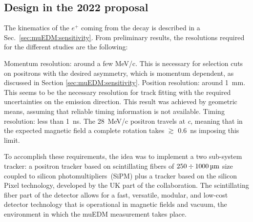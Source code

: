 \begin{refsection}
\section{Design in the 2022 proposal}
\label{sec:muEDM:proposal}
    The kinematics of the $e^+$ coming from the decay is described in a Sec.~\ref{sec:muEDM:sensitivity}.
    From preliminary results, the resolutions required for the different studies are the following:
    \begin{outline}
        \1 Momentum resolution: around a few MeV/c. 
        This is necessary for selection cuts on positrons with the desired asymmetry, which is momentum dependent, as discussed in Section \ref{sec:muEDM:sensitivity}.
        \1 Position resolution: around \SI{1}{mm}. This seems to be the necessary resolution for track fitting with the required uncertainties on the emission direction. 
        This result was achieved by geometric means, assuming that reliable timing information is not available. 
        \1 Timing resolution: less than \SI{1}{ns}. The \SI{28}{MeV/c} positron travels at \textit{c}, meaning that in the expected magnetic field a complete rotation takes $\gtrsim$ \SI{0.6}{ns} imposing this limit. 
    \end{outline}
    \noindent
    To accomplish these requirements, the idea was to implement a two sub-system tracker: a positron tracker based on scintillating fibers of $250\divisionsymbol\SI{1000}{\micro\meter}$ size coupled to silicon photomultipliers~(SiPM) plus a tracker based on the silicon Pixel technology, developed by the UK part of the collaboration.  
    The scintillating fiber part of the detector allows for a fast, versatile, modular, and low-cost detector technology that is operational in magnetic fields and vacuum, the environment in which the muEDM measurement takes place.
    

\end{refsection}

